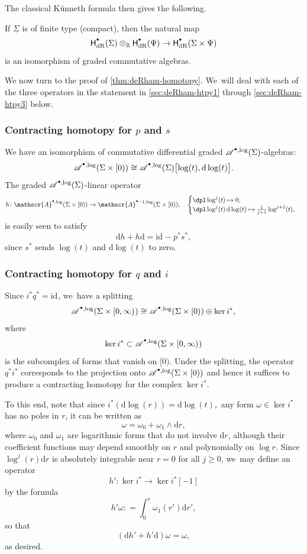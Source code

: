 \documentclass[JEP,XML,SOM,Unicode,NoFloatCountersInSection,published]{cedram}
\let\oldbullet\bullet
\renewcommand{\bullet}{{\raisebox{1pt}{$\scriptscriptstyle\oldbullet$}}}
\newcommand\mto{\mathchoice{\longmapsto}{\mapsto}{\mapsto}{\mapsto}}
\theoremstyle{definition}
\theoremstyle{remark}
\newcommand{\RR}{\mathbb{R}}
\newcommand{\halfspc}[1]{[0,\infty)^{#1}}
\newcommand{\id}[1]{\mathrm{id}_{#1}}
\renewcommand{\ge}{\geqslant}
\newcommand{\defas}{\mathrel{\mathop:}=}
\newcommand{\dd}{\mathrm{d}}
\newcommand{\Alog}[2][\bullet]{\mathscr{A}^{#1,\log}(#2)}
\newcommand{\Sig}{\Sigma}
\newcommand{\uSig}{\underline{\Sigma}}
\newcommand{\HdR}[2][\bullet]{\mathsf{H}_{\mathrm{dR}}^{#1}(#2)}
\begin{document}
The classical Künneth formula then gives the following.
\begin{corollary}
If $\uSig$ is of finite type (\eg compact), then the natural map
\[
\HdR{\Sig} \otimes_\RR \HdR{\Psi} \to \HdR{\Sig\times\Psi}
\]
is an isomorphism of graded commutative algebras.
\end{corollary}

We now turn to the proof of \autoref{thm:deRham-homotopy}. We~will deal with each of the three operators in the statement in \autoref{sec:deRham-htpy1} through \autoref{sec:deRham-htpy3} below.

\subsubsection{Contracting homotopy for $p$ and $s$}\label{sec:deRham-htpy1}
We have an isomorphism of commutative differential graded $\Alog{\Sig}$-algebras:
\[
\Alog{\Sig\times[0)} \cong \Alog{\Sig}\bigl[\log(t), \dd\log(t)\bigr].
\]
The graded $\Alog{\Sig}$-linear operator
\[
h \colon \Alog{\Sig\times[0)} \to \Alog[\bullet-1]{\Sig\times[0)}, \quad \begin{cases} \dpl\log^j(t)\mto 0, \\ \dpl\log^j(t)\,\dd\log(t) \mto \frac{1}{j+1}\log^{j+1}(t), \end{cases}
\]
is easily seen to satisfy
\[
\dd h + h \dd = \id{} - p^*s^*,
\]
since $s^*$ sends $\log(t)$ and $\dd\log(t)$ to zero.

\subsubsection{Contracting homotopy for $q$ and $i$}\label{sec:deRham-htpy2}

Since $i^*q^* = \id{}$, we~have a splitting
\[
\Alog{\Sig \times \halfspc{}} \cong \Alog{\Sig\times[0)} \oplus \ker i^*,
\]
where
\[
\ker i^* \subset \Alog{\Sig\times\halfspc{}}
\]
is the subcomplex of forms that vanish on $[0)$. Under the splitting, the operator $q^*i^*$ corresponds to the projection onto $\Alog{\Sig\times[0)}$ and hence it suffices to produce a contracting homotopy for the complex $\ker i^*$.

To this end, note that since $i^* (\dd\log(r))=\dd\log(t),$ any form $\omega \in \ker i^*$ has no poles in $r$, \ie it can be written as
\[
\omega = \omega_0 + \omega_1\wedge \dd r,
\]
where $\omega_0$ and $\omega_1$ are logarithmic forms that do not involve $\dd r$, although their coefficient functions may depend smoothly on $r$ and polynomially on $\log r$. Since $\log^j(r)\dd r$ is absolutely integrable near $r=0$ for all $j\ge 0$, we~may define an operator
\[
h' \colon \ker i^* \to \ker i^*[-1]
\]
by the formula
\[
h'\omega \defas \int_0^r \omega_1(r') \dd r',
\]
so that
\[
(\dd h' + h' \dd )\omega = \omega,
\]
as desired.
\end{document}
